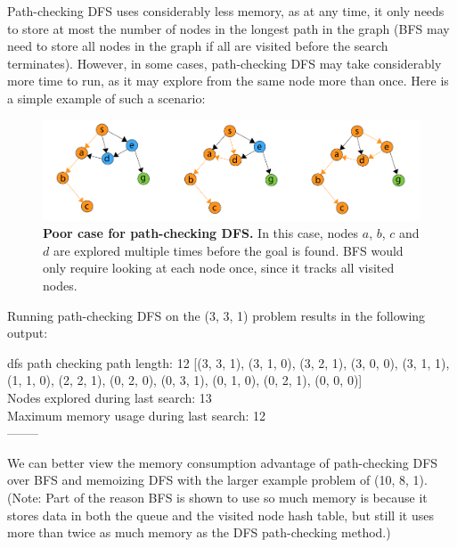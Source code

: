 \documentclass{article}
\begin{document}
Path-checking DFS uses considerably less memory, as at any time, it only needs to store at most the number of nodes in the longest path in the graph (BFS may need to store all nodes in the graph if all are visited before the search terminates). However, in some cases, path-checking DFS may take considerably more time to run, as it may explore from the same node more than once. Here is a simple example of such a scenario:

\begin{figure}[!htb]
\centering
\includegraphics[scale=.35]{PCDFS.pdf}
\caption{{\bf Poor case for path-checking DFS.} In this case, nodes $a$, $b$, $c$ and $d$ are explored multiple times before the goal is found. BFS would only require looking at each node once, since it tracks all visited nodes.}
\label{fig:PCDFS}
\end{figure}

Running path-checking DFS on the (3, 3, 1) problem results in the following output:

\vspace{5mm}

{\setlength{\parindent}{0cm}
dfs path checking path length: 12 [(3, 3, 1), (3, 1, 0), (3, 2, 1), (3, 0, 0), (3, 1, 1), (1, 1, 0), (2, 2, 1), (0, 2, 0), (0, 3, 1), (0, 1, 0), (0, 2, 1), (0, 0, 0)]\\
Nodes explored during last search: 13\\
Maximum memory usage during last search: 12\\
--------}

We can better view the memory consumption advantage of path-checking DFS over BFS and memoizing DFS with the larger example problem of (10, 8, 1). (Note: Part of the reason BFS is shown to use so much memory is because it stores data in both the queue and the visited node hash table, but still it uses more than twice as much memory as the DFS path-checking method.)

\vspace{5mm}
\end{document}
